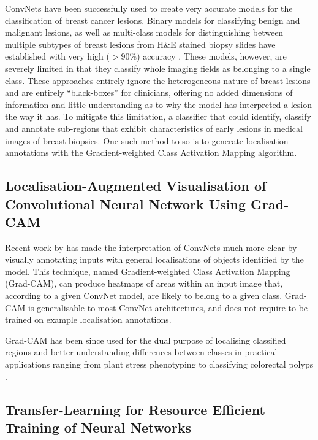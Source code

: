 ConvNets have been successfully used to create very accurate models for the classification of breast cancer lesions. Binary models for classifying benign and malignant lesions, as well as multi-class models for distinguishing between multiple subtypes of breast lesions from H\&E stained biopsy slides have established with very high ($>90\%$) accuracy \citep{wei2017, han2017}. These models, however, are severely limited in that they classify whole imaging fields as belonging to a single class. These approaches entirely ignore the heterogeneous nature of breast lesions and are entirely ``black-boxes'' for clinicians, offering no added dimensions of information and little understanding as to why the model has interpreted a lesion the way it has. To mitigate this limitation, a classifier that could identify, classify and annotate sub-regions that exhibit characteristics of early lesions in medical images of breast biopsies. One such method to so is to generate localisation annotations with the Gradient-weighted Class Activation Mapping algorithm. \par

\subsection{Localisation-Augmented Visualisation of Convolutional Neural Network Using Grad-CAM}

Recent work by \citeauthor{selvaraju2016} has made the interpretation of ConvNets much more clear by visually annotating inputs with general localisations of objects identified by the model. This technique, named Gradient-weighted Class Activation Mapping (Grad-CAM), can produce heatmaps of areas within an input image that, according to a given ConvNet model, are likely to belong to a given class. Grad-CAM is generalisable to most ConvNet architectures, and does not require to be trained on example localisation annotations.\par

Grad-CAM has been since used for the dual purpose of localising classified regions and better understanding differences between classes in practical applications ranging from plant stress phenotyping to classifying colorectal polyps \citep{ghosal2017,korbar2017}.\par

\subsection{Transfer-Learning for Resource Efficient Training of Neural Networks}

